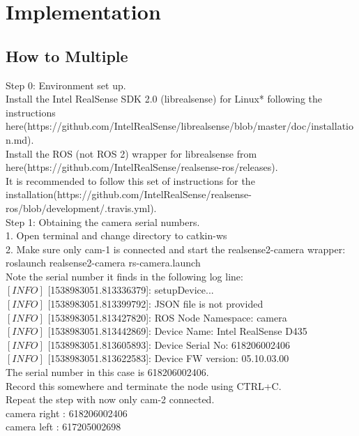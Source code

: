 \chapter{Implementation}
\section{How to Multiple}
Step 0: Environment set up.\\
 Install the Intel RealSense SDK 2.0 (librealsense) for Linux* following the instructions here(https://github.com/IntelRealSense/librealsense/blob/master/doc/installation.md).\\
Install the ROS (not ROS 2) wrapper for librealsense from here(https://github.com/IntelRealSense/realsense-ros/releases).\\
 It is recommended to follow this set of instructions for the installation(https://github.com/IntelRealSense/realsense-ros/blob/development/.travis.yml).\\

Step 1: Obtaining the camera serial numbers.\\
1. Open terminal and change directory to catkin-ws\\
2. Make sure only cam-1 is connected and start the realsense2-camera wrapper:\\
roslaunch realsense2-camera rs-camera.launch\\
Note the serial number it finds in the following log line:\\
$[INFO]$ [1538983051.813336379]: setupDevice...\\
$[INFO]$ [1538983051.813399792]: JSON file is not provided\\
$[INFO]$ [1538983051.813427820]: ROS Node Namespace: camera\\
$[INFO]$ [1538983051.813442869]: Device Name: Intel RealSense D435\\
$[INFO]$ [1538983051.813605893]: Device Serial No: 618206002406\\
$[INFO]$ [1538983051.813622583]: Device FW version: 05.10.03.00\\
The serial number in this case is 618206002406.\\
Record this somewhere and terminate the node using CTRL+C.\\
Repeat the step with now only cam-2 connected.\\
   camera right : 618206002406\\
   camera left  : 617205002698\\
   
